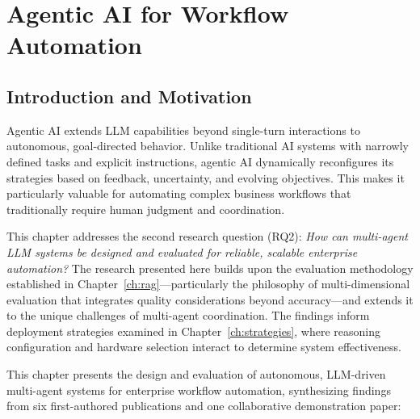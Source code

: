 \chapter{Agentic AI for Workflow Automation}
\label{ch:agentic}

\section{Introduction and Motivation}
\label{sec:agentic_intro}

Agentic AI extends LLM capabilities beyond single-turn interactions to autonomous, goal-directed behavior. Unlike traditional AI systems with narrowly defined tasks and explicit instructions, agentic AI dynamically reconfigures its strategies based on feedback, uncertainty, and evolving objectives. This makes it particularly valuable for automating complex business workflows that traditionally require human judgment and coordination.

This chapter addresses the second research question (RQ2): \textit{How can multi-agent LLM systems be designed and evaluated for reliable, scalable enterprise automation?} The research presented here builds upon the evaluation methodology established in Chapter~\ref{ch:rag}---particularly the philosophy of multi-dimensional evaluation that integrates quality considerations beyond accuracy---and extends it to the unique challenges of multi-agent coordination. The findings inform deployment strategies examined in Chapter~\ref{ch:strategies}, where reasoning configuration and hardware selection interact to determine system effectiveness.

This chapter presents the design and evaluation of autonomous, LLM-driven multi-agent systems for enterprise workflow automation, synthesizing findings from six first-authored publications and one collaborative demonstration paper:

